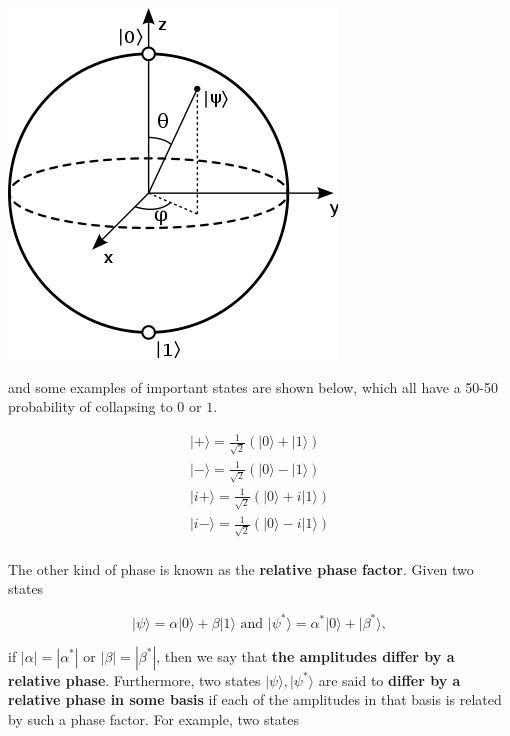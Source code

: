 \documentclass{article}
\theoremstyle{definition}
\begin{document}
    \begin{center}
      \includegraphics[scale=0.4]{img/330px-Bloch_sphere.png}
    \end{center}

    and some examples of important states are shown below, which all have a 50-50 probability of collapsing to $0$ or $1$. 

    \begin{align*} 
      |+\rangle = \frac{1}{\sqrt{2}} (|0\rangle + |1\rangle) \\ 
      |-\rangle = \frac{1}{\sqrt{2}} (|0\rangle - |1\rangle) \\ 
      |i+\rangle = \frac{1}{\sqrt{2}} (|0\rangle + i|1\rangle) \\ 
      |i-\rangle = \frac{1}{\sqrt{2}} (|0\rangle - i|1\rangle) \\ 
    \end{align*}

    The other kind of phase is known as the \textbf{relative phase factor}. Given two states

      \[|\psi \rangle = \alpha |0\rangle + \beta |1\rangle \text{ and } |\psi^* \rangle = \alpha^* |0 \rangle + | \beta^* \rangle,\]

    if $|\alpha| = |\alpha^*|$ or $|\beta| = |\beta^*|$, then we say that \textbf{the amplitudes differ by a relative phase}. Furthermore, two states $|\psi \rangle, |\psi^* \rangle$ are said to \textbf{differ by a relative phase in some basis} if each of the amplitudes in that basis is related by such a phase factor. For example, two states 
\end{document}
